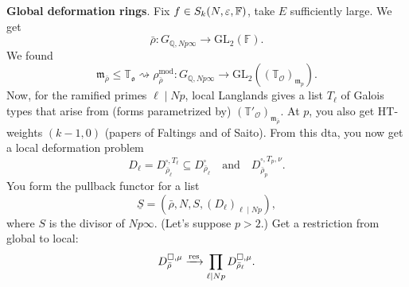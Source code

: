 \documentclass[reqno]{amsart} 
\begin{document}
\textbf{Global deformation rings}.  Fix $f \in S_k(N, \varepsilon, \mathbb{F})$, take $E$ sufficiently large.  We get
\begin{equation*}
  \bar{\rho} : G_{\mathbb{Q}, N p \infty} \rightarrow \mathrm{GL}_2(\mathbb{F}).
\end{equation*}
We found
\begin{equation*}
  \mathfrak{m}_{\bar{\rho}} \leq \mathbb{T}_{\mathfrak{o}} \rightsquigarrow \rho_{\bar{\rho}}^{\mathrm{mod}} : G_{\mathbb{Q}, N p \infty}
  \rightarrow \mathrm{GL}_2 \left((\mathbb{T}_{\mathcal{O}})_{\mathfrak{m}_p} \right).
\end{equation*}
Now, for the ramified primes $\ell \mid N p$, local Langlands gives a list $T_{\ell}$ of Galois types that arise from (forms parametrized by) $(\mathbb{T}'_{\mathcal{O}})_{\mathfrak{m}_{\bar{\rho}}}$.  At $p$, you also get $\mathrm{H T}$-weights $(k - 1, 0)$ (papers of Faltings and of Saito).  From this dta, you now get a local deformation problem
\begin{equation*}
  D_{\ell} = D_{\bar{\rho}_{\ell}}^{\square, T_{\ell}} \subseteq D_{\bar{\rho}_{\ell}}^{\square}
  \quad \text{and} \quad
  D_{\bar{\rho}_p}^{\square, T_p, \nu}.
\end{equation*}
You form the pullback functor for a list
\begin{equation*}
  \underline{S} =(\bar{\rho}, N, S,(D_{\ell})_{\ell \mid N p}),
\end{equation*}
where $S$ is the divisor of $N p \infty$. (Let's suppose $p > 2$.)  Get a restriction from global to local:
\begin{equation*}
  D_{\bar{\rho}}^{\square, \mu}
  \xrightarrow{\operatorname{res}}
  \prod_{\ell \mid N p}
  D_{\bar{\rho}_{\ell}}^{\square, \mu}.
\end{equation*}
\end{document}
